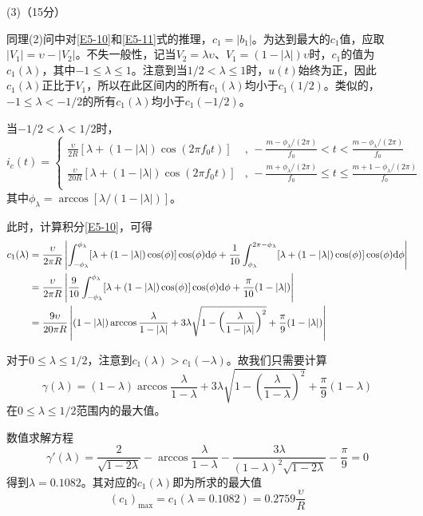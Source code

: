 \documentclass[10pt,a4paper,onecolumn,UTF8]{ctexart}
\begin{document}
	(3)（15分）
	
	同理(2)问中对\eqref{E5-10}和\eqref{E5-11}式的推理，$c_1=|b_1|$。为达到最大的$c_1$值，应取$|V_1|=\upsilon-|V_2|$。不失一般性，记当$V_2=\lambda\upsilon$、$V_1=(1-|\lambda|)\upsilon$时，$c_1$的值为$c_1(\lambda)$，其中$-1\leq\lambda\leq1$。注意到当$1/2<\lambda\leq1$时，$u(t)$始终为正，因此$c_1(\lambda)$正比于$V_1$，所以在此区间内的所有$c_1(\lambda)$均小于$c_1(1/2)$。类似的，$-1\leq\lambda<-1/2$的所有$c_1(\lambda)$均小于$c_1(-1/2)$。
	
	当$-1/2<\lambda<1/2$时，
	\begin{equation}
		i_c(t)=\left\{\begin{aligned}
			\frac{\upsilon}{2R}[\lambda+(1-|\lambda|)\cos(2\pi f_0 t)]&,\,-\frac{m-\phi_{\lambda}/(2\pi)}{f_0}<t<\frac{m-\phi_{\lambda}/(2\pi)}{f_0}\\
			\frac{\upsilon}{20R}[\lambda+(1-|\lambda|)\cos(2\pi f_0 t)]&,\,-\frac{m+\phi_{\lambda}/(2\pi)}{f_0}\leq t\leq\frac{m+1-\phi_{\lambda}/(2\pi)}{f_0}\\
		\end{aligned}\right.
	\end{equation}
	其中$\phi_{\lambda}=\arccos[\lambda/(1-|\lambda|)]$。
	
	此时，计算积分\eqref{E5-10}，可得
	\begin{equation}
		\begin{aligned}
			c_1(\lambda)&=\frac{\upsilon}{2\pi R}\left|\int_{-\phi_{\lambda}}^{\phi_{\lambda}}[\lambda+(1-|\lambda|)\cos(\phi)]\cos(\phi)\mathrm{d}\phi+\frac{1}{10}\int_{\phi_{\lambda}}^{2\pi-\phi_{\lambda}}[\lambda+(1-|\lambda|)\cos(\phi)]\cos(\phi)\mathrm{d}\phi\right|\\
			&=\frac{\upsilon}{2\pi R}\left|\frac{9}{10}\int_{-\phi_{\lambda}}^{\phi_{\lambda}}[\lambda+(1-|\lambda|)\cos(\phi)]\cos(\phi)\mathrm{d}\phi+\frac{\pi}{10}(1-|\lambda|)\right|\\
			&=\frac{9\upsilon}{20\pi R}\left|(1-|\lambda|)\arccos\frac{\lambda}{1-|\lambda|}+3\lambda\sqrt{1-\left(\frac{\lambda}{1-|\lambda|}\right)^2}+\frac{\pi}{9}(1-|\lambda|)\right|
		\end{aligned}
	\end{equation}
	
	对于$0\leq\lambda\leq1/2$，注意到$c_1(\lambda)>c_1(-\lambda)$。故我们只需要计算
	$$\gamma(\lambda)=(1-\lambda)\arccos\frac{\lambda}{1-\lambda}+3\lambda\sqrt{1-\left(\frac{\lambda}{1-\lambda}\right)^2}+\frac{\pi}{9}(1-\lambda)$$
	在$0\leq\lambda\leq1/2$范围内的最大值。
	
	数值求解方程
	$$\gamma'(\lambda)=\frac{2}{\sqrt{1-2\lambda}}-\arccos\frac{\lambda}{1-\lambda}-\frac{3\lambda}{(1-\lambda)^2\sqrt{1-2\lambda}}-\frac{\pi}{9}=0$$
	得到$\lambda=0.1082$。其对应的$c_1(\lambda)$即为所求的最大值
	\begin{equation}
		(c_1)_{\max}=c_1(\lambda=0.1082)=0.2759\frac{\upsilon}{R}
	\end{equation}
	
\end{document}
